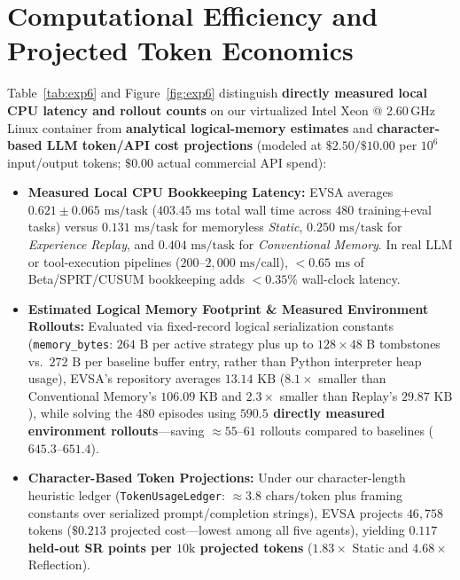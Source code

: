 \documentclass[10pt,letterpaper]{article}
\begin{document}
\section{Computational Efficiency and Projected Token Economics}
Table~\ref{tab:exp6} and Figure~\ref{fig:exp6} distinguish \textbf{directly measured local CPU latency and rollout counts} on our virtualized Intel Xeon @ 2.60\,GHz Linux container from \textbf{analytical logical-memory estimates} and \textbf{character-based LLM token/API cost projections} (modeled at $\$2.50 / \$10.00$ per $10^6$ input/output tokens; $\$0.00$ actual commercial API spend):
\begin{itemize}
  \item \textbf{Measured Local CPU Bookkeeping Latency:} EVSA averages \textbf{$0.621 \pm 0.065\text{ ms/task}$} ($403.45\text{ ms}$ total wall time across $480$ training+eval tasks) versus $0.131\text{ ms/task}$ for memoryless \emph{Static}, $0.250\text{ ms/task}$ for \emph{Experience Replay}, and $0.404\text{ ms/task}$ for \emph{Conventional Memory}. In real LLM or tool-execution pipelines ($200\text{--}2{,}000\text{ ms/call}$), $<0.65\text{ ms}$ of Beta/SPRT/CUSUM bookkeeping adds $<0.35\%$ wall-clock latency.
  \item \textbf{Estimated Logical Memory Footprint \& Measured Environment Rollouts:} Evaluated via fixed-record logical serialization constants (\texttt{memory\_bytes}: $264\text{ B}$ per active strategy plus up to $128 \times 48\text{ B}$ tombstones vs.\ $272\text{ B}$ per baseline buffer entry, rather than Python interpreter heap usage), EVSA's repository averages \textbf{$13.14\text{ KB}$} ($8.1\times$ smaller than Conventional Memory's $106.09\text{ KB}$ and $2.3\times$ smaller than Replay's $29.87\text{ KB}$), while solving the 480 episodes using \textbf{$590.5$ directly measured environment rollouts}—saving $\approx 55\text{--}61$ rollouts compared to baselines ($645.3\text{--}651.4$).
  \item \textbf{Character-Based Token Projections:} Under our character-length heuristic ledger (\texttt{TokenUsageLedger}: $\approx 3.8\text{ chars/token}$ plus framing constants over serialized prompt/completion strings), EVSA projects $46{,}758$ tokens ($\$0.213$ projected cost—lowest among all five agents), yielding \textbf{$0.117$ held-out SR points per $10\text{k}$ projected tokens} ($1.83\times$ Static and $4.68\times$ Reflection).
\end{itemize}
\end{document}
